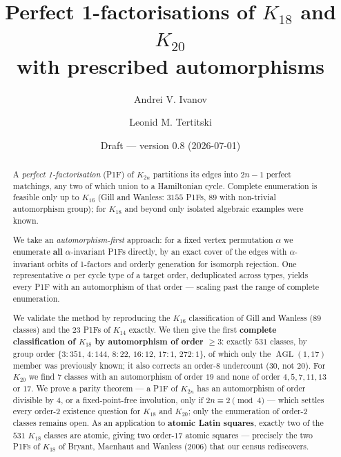 \documentclass[11pt,reqno]{amsart}
\theoremstyle{plain}
\theoremstyle{definition}
\numberwithin{theorem}{section}
\newcommand{\AGL}{\operatorname{AGL}}
\begin{document}
\title[Perfect 1-factorisations of $K_{18}$ and $K_{20}$]
{Perfect 1-factorisations of $K_{18}$ and $K_{20}$\\ with prescribed automorphisms}

\author{Andrei V. Ivanov}
\address{Andrei V. Ivanov, Independent Researcher, San Jose, CA, USA}

\author{Leonid M. Tertitski}
\address{Leonid M. Tertitski, Independent Researcher, Carlsbad, CA, USA}

\date{Draft --- version 0.8 (2026-07-01)}

\begin{abstract}
A \emph{perfect 1-factorisation} (P1F) of $K_{2n}$ partitions its edges into $2n-1$
perfect matchings, any two of which union to a Hamiltonian cycle. Complete enumeration
is feasible only up to $K_{16}$ (Gill and Wanless: $3155$ P1Fs, $89$ with non-trivial
automorphism group); for $K_{18}$ and beyond only isolated algebraic examples were known.

We take an \emph{automorphism-first} approach: for a fixed vertex permutation $\alpha$
we enumerate \textbf{all} $\alpha$-invariant P1Fs directly, by an exact cover of the edges
with $\alpha$-invariant orbits of 1-factors and orderly generation for isomorph rejection.
One representative $\alpha$ per cycle type of a target order, deduplicated across types,
yields every P1F with an automorphism of that order --- scaling past the range of complete
enumeration.

We validate the method by reproducing the $K_{16}$ classification of Gill and Wanless
($89$ classes) and the $23$ P1Fs of $K_{14}$ exactly. We then give the first
\textbf{complete classification of $K_{18}$ by automorphism of order $\ge 3$}: exactly
\textbf{$531$} classes, by group order
$\{3{:}351,\,4{:}144,\,8{:}22,\,16{:}12,\,17{:}1,\,272{:}1\}$, of which only the
$\AGL(1,17)$ member was previously known; it also corrects an order-$8$ undercount
($30$, not $20$). For $K_{20}$ we find $7$ classes with
an automorphism of order $19$ and none of order $4,5,7,11,13$ or $17$. We prove a parity
theorem --- a P1F of $K_{2n}$ has an automorphism of order divisible by $4$, or a
fixed-point-free involution, only if $2n\equiv 2\pmod 4$ --- which settles every order-$2$
existence question for $K_{18}$ and $K_{20}$; only the enumeration of order-$2$ classes
remains open. As an application to \textbf{atomic Latin squares},
exactly two of the $531$ $K_{18}$ classes are atomic, giving two order-$17$ atomic squares
--- precisely the two P1Fs of $K_{18}$ of Bryant, Maenhaut and Wanless (2006) that our
census rediscovers.
\end{abstract}
\end{document}
